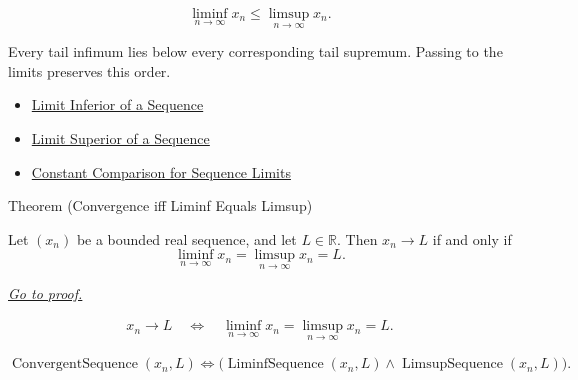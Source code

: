 \begin{remark*}
\[
\liminf_{n\to\infty}x_n\le \limsup_{n\to\infty}x_n.
\]
\end{remark*}

\begin{remark*}[Interpretation]
Every tail infimum lies below every corresponding tail supremum. Passing to
the limits preserves this order.
\end{remark*}

\begin{dependencies}
\begin{itemize}
  \item \hyperref[def:liminf-sequence]{Limit Inferior of a Sequence}
  \item \hyperref[def:limsup-sequence]{Limit Superior of a Sequence}
  \item \hyperref[thm:constant-comparison-for-sequence-limits]{Constant Comparison for Sequence Limits}
\end{itemize}
\end{dependencies}


\begin{theorembox}{Theorem (Convergence iff Liminf Equals Limsup)}
\begin{theorem}
\label{thm:convergence-iff-liminf-equals-limsup}
Let $(x_n)$ be a bounded real sequence, and let $L\in\mathbb{R}$. Then
$x_n\to L$ if and only if
\[
  \liminf_{n\to\infty}x_n
  =
  \limsup_{n\to\infty}x_n
  =
  L.
\]

\smallskip
\noindent
\hyperref[prf:convergence-iff-liminf-equals-limsup]{\textit{Go to proof.}}
\end{theorem}
\end{theorembox}

\begin{remark*}
\[
\begin{aligned}
x_n\to L
\quad\Longleftrightarrow\quad
\liminf_{n\to\infty}x_n
=
\limsup_{n\to\infty}x_n
=L.
\end{aligned}
\]
\end{remark*}

\begin{remark*}
\[
\operatorname{ConvergentSequence}(x_n,L)
\Longleftrightarrow
\bigl(
  \operatorname{LiminfSequence}(x_n,L)
  \land
  \operatorname{LimsupSequence}(x_n,L)
\bigr).
\]
\end{remark*}

